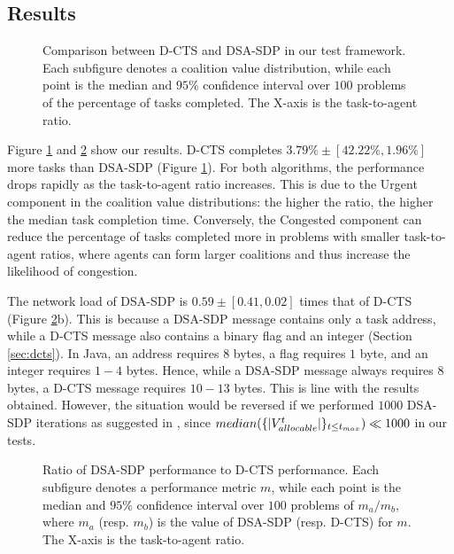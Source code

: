 \subsection{Results}\label{sec:rres}

\begin{figure}[t]
    \centering
    \begin{adjustbox}{width=\textwidth}
        
    \end{adjustbox}
    \caption[Comparison between D-CTS and DSA-SDP]{Comparison between D-CTS and DSA-SDP in
        our test framework. Each subfigure denotes a coalition value distribution, while
        each point is the median and $95\%$ confidence interval over $100$ problems of the
        percentage of tasks completed. The X-axis is the task-to-agent ratio.}
    \label{fig:dcts-t}
\end{figure}

Figure \ref{fig:dcts-t} and \ref{fig:dcts-t2} show our results. D-CTS completes $3.79\%
\pm [42.22\%, 1.96\%]$ more tasks than DSA-SDP (Figure \ref{fig:dcts-t}). For both
algorithms, the performance drops rapidly as the task-to-agent ratio increases. This is
due to the Urgent component in the coalition value distributions: the higher the ratio,
the higher the median task completion time.
Conversely, the Congested component can reduce the percentage of tasks completed more in
problems with smaller task-to-agent ratios, where agents can form larger coalitions and
thus increase the likelihood of congestion.

The network load of DSA-SDP is $0.59 \pm [0.41, 0.02]$ times that of D-CTS (Figure
\ref{fig:dcts-t2}b). This is because a DSA-SDP message contains only a task address,
while a D-CTS message also contains a binary flag and an integer (Section
\ref{sec:dcts}). In Java, an address requires $8$ bytes, a flag requires $1$ byte, and
an integer requires $1 - 4$ bytes. Hence, while a DSA-SDP message always requires $8$
bytes, a D-CTS message requires $10 - 13$ bytes. This is line with the results obtained.
However, the situation would be reversed if we performed $1000$ DSA-SDP iterations as
suggested in \cite{zhang2005}, since $median(\{ |V^t_{allocable}| \}_{t \leq t_{max}}) \ll
1000$ in our tests.

\begin{figure}[t]
    \centering
    \begin{adjustbox}{width=\textwidth}
        
    \end{adjustbox}
    \caption[Ratio of DSA-SDP performance to D-CTS performance]{%
        Ratio of DSA-SDP performance to D-CTS performance. Each subfigure denotes a
        performance metric $m$, while each point is the median and $95\%$ confidence
        interval over $100$ problems of $m_a / m_b$, where $m_a$ (resp. $m_b$) is the
        value of DSA-SDP (resp. D-CTS) for $m$. The X-axis is the task-to-agent ratio.}
    \label{fig:dcts-t2}
\end{figure}

